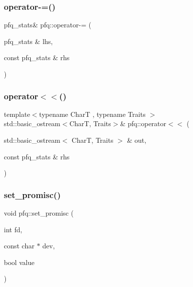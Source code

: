 \mbox{\label{namespacepfq_aa7874ca8c38d2bb9b66a33a6c2bb0fc1}} 
\subsubsection{\texorpdfstring{operator-\/=()}{operator-=()}}
{\footnotesize\ttfamily pfq\+\_\+stats\& pfq\+::operator-\/= (\begin{DoxyParamCaption}\item[{pfq\+\_\+stats \&}]{lhs,  }\item[{const pfq\+\_\+stats \&}]{rhs }\end{DoxyParamCaption})\hspace{0.3cm}{\ttfamily [inline]}}

\mbox{\label{namespacepfq_a1c2bda68e2e2c718ebd80519034002a3}} 
\subsubsection{\texorpdfstring{operator$<$$<$()}{operator<<()}}
{\footnotesize\ttfamily template$<$typename CharT , typename Traits $>$ \\
std\+::basic\+\_\+ostream$<$CharT, Traits$>$\& pfq\+::operator$<$$<$ (\begin{DoxyParamCaption}\item[{std\+::basic\+\_\+ostream$<$ CharT, Traits $>$ \&}]{out,  }\item[{const pfq\+\_\+stats \&}]{rhs }\end{DoxyParamCaption})}

\mbox{\label{namespacepfq_a62b9f1831dc714353f6edcb66a4fad4d}} 
\subsubsection{\texorpdfstring{set\+\_\+promisc()}{set\_promisc()}}
{\footnotesize\ttfamily void pfq\+::set\+\_\+promisc (\begin{DoxyParamCaption}\item[{int}]{fd,  }\item[{const char $\ast$}]{dev,  }\item[{bool}]{value }\end{DoxyParamCaption})\hspace{0.3cm}{\ttfamily [inline]}}



